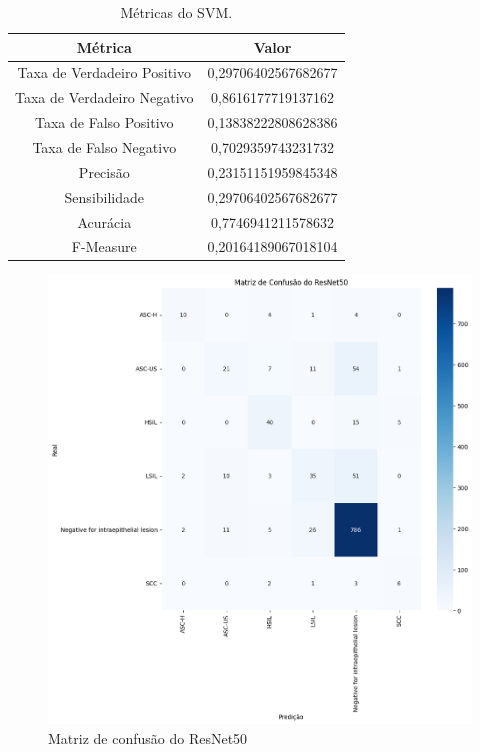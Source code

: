 \documentclass[12pt]{article}
\begin{document}
\begin{table}[]
    \centering
    \begin{tabular}{|c|c|}
        \hline
         Métrica & Valor\\
         \hline
         Taxa de Verdadeiro Positivo & 0,29706402567682677\\
         \hline
         Taxa de Verdadeiro Negativo & 0,8616177719137162\\
         \hline
         Taxa de Falso Positivo & 0,13838222808628386\\
         \hline
         Taxa de Falso Negativo & 0,7029359743231732\\
         \hline
         Precisão & 0,23151151959845348\\
         \hline
         Sensibilidade & 0,29706402567682677\\
         \hline
         Acurácia & 0,7746941211578632\\
         \hline
         F-Measure & 0,20164189067018104\\
         \hline
    \end{tabular}
    \caption{Métricas do SVM.}
    \label{tab:metricas-svm}
\end{table}

\begin{figure}
    \centering
    \includegraphics[width=\textwidth]{Matriz confusao ResNet50.png}
    \caption{Matriz de confusão do ResNet50}
    \label{fig:matrix-confusao-resnet50}
\end{figure}
\end{document}
